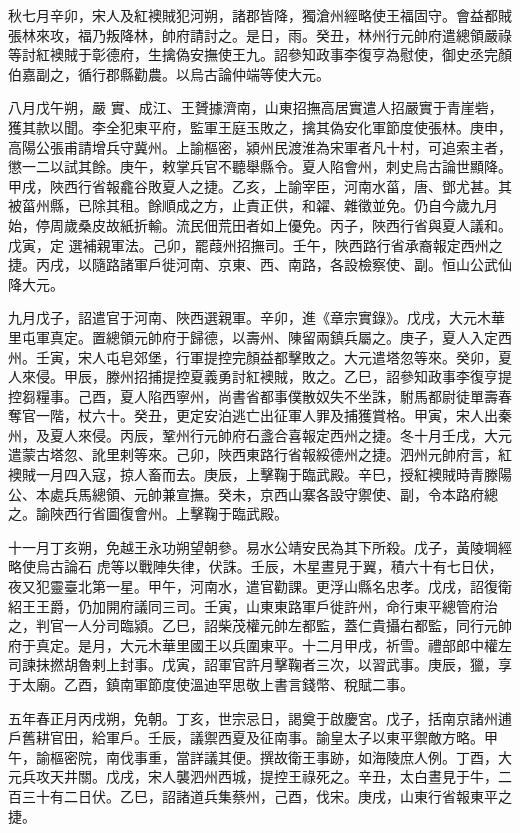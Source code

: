 \begin{pinyinscope}
 秋七月辛卯，宋人及紅襖賊犯河朔，諸郡皆降，獨滄州經略使王福固守。會益都賊張林來攻，福乃叛降林，帥府請討之。是日，雨。癸丑，林州行元帥府遣總領嚴祿等討紅襖賊于彰德府，生擒偽安撫使王九。詔參知政事李復亨為慰使，御史丞完顏伯嘉副之，循行郡縣勸農。以烏古論仲端等使大元。



 八月戊午朔，嚴
 實、成江、王贇據濟南，山東招撫高居實遣人招嚴實于青崖砦，獲其款以聞。李全犯東平府，監軍王庭玉敗之，擒其偽安化軍節度使張林。庚申，高陽公張甫請增兵守冀州。上諭樞密，潁州民渡淮為宋軍者凡十村，可追索主者，懲一二以試其餘。庚午，敕掌兵官不聽舉縣令。夏人陷會州，刺史烏古論世顯降。甲戌，陜西行省報龕谷敗夏人之捷。乙亥，上諭宰臣，河南水菑，唐、鄧尤甚。其被菑州縣，已除其租。餘順成之方，止責正供，和糴、雜徵並免。仍自今歲九月始，停周歲桑皮故紙折輸。流民佃荒田者如上優免。丙子，陜西行省與夏人議和。戊寅，定
 選補親軍法。己卯，罷葭州招撫司。壬午，陜西路行省承裔報定西州之捷。丙戌，以隨路諸軍戶徙河南、京東、西、南路，各設檢察使、副。恒山公武仙降大元。



 九月戊子，詔遣官于河南、陜西選親軍。辛卯，進《章宗實錄》。戊戌，大元木華里屯軍真定。置總領元帥府于歸德，以壽州、陳留兩鎮兵屬之。庚子，夏人入定西州。壬寅，宋人屯皂郊堡，行軍提控完顏益都擊敗之。大元遣塔忽等來。癸卯，夏人來侵。甲辰，滕州招捕提控夏義勇討紅襖賊，敗之。乙巳，詔參知政事李復亨提控芻糧事。己酉，夏人陷西寧州，尚書省都事僕散奴失不坐誅，駙馬都尉徒單壽春
 奪官一階，杖六十。癸丑，更定安泊逃亡出征軍人罪及捕獲賞格。甲寅，宋人出秦州，及夏人來侵。丙辰，鞏州行元帥府石盞合喜報定西州之捷。冬十月壬戌，大元遣蒙古塔忽、訛里剌等來。己卯，陜西東路行省報綏德州之捷。泗州元帥府言，紅襖賊一月四入寇，掠人畜而去。庚辰，上擊鞠于臨武殿。辛巳，授紅襖賊時青滕陽公、本處兵馬總領、元帥兼宣撫。癸未，京西山寨各設守禦使、副，令本路府總之。諭陜西行省圖復會州。上擊鞠于臨武殿。



 十一月丁亥朔，免越王永功朔望朝參。易水公靖安民為其下所殺。戊子，黃陵堈經略使烏古論石
 虎等以戰陣失律，伏誅。壬辰，木星晝見于翼，積六十有七日伏，夜又犯靈臺北第一星。甲午，河南水，遣官勸課。更浮山縣名忠孝。戊戌，詔復衛紹王王爵，仍加開府議同三司。壬寅，山東東路軍戶徙許州，命行東平總管府治之，判官一人分司臨潁。乙巳，詔柴茂權元帥左都監，蓋仁貴攝右都監，同行元帥府于真定。是月，大元木華里國王以兵圍東平。十二月甲戌，祈雪。禮部郎中權左司諫抹撚胡魯剌上封事。戊寅，詔軍官許月擊鞠者三次，以習武事。庚辰，獵，享于太廟。乙酉，鎮南軍節度使溫迪罕思敬上書言錢幣、稅賦二事。



 五年春正月丙戌朔，免朝。丁亥，世宗忌日，謁奠于啟慶宮。戊子，括南京諸州逋戶舊耕官田，給軍戶。壬辰，議禦西夏及征南事。諭皇太子以東平禦敵方略。甲午，諭樞密院，南伐事重，當詳議其便。撰故衛王事跡，如海陵庶人例。丁酉，大元兵攻天井關。戊戌，宋人襲泗州西城，提控王祿死之。辛丑，太白晝見于牛，二百三十有二日伏。乙巳，詔諸道兵集蔡州，己酉，伐宋。庚戌，山東行省報東平之捷。




\end{pinyinscope}
